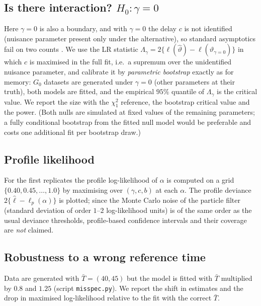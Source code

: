 \documentclass[11pt,a4paper]{article}
\newcommand{\Tb}{\bar T}
\begin{document}
\subsection{Is there interaction? $H_0:\gamma=0$}
Here $\gamma=0$ is also a boundary, and with $\gamma=0$ the delay $c$ is not identified (nuisance parameter present only under the alternative), so standard asymptotics fail on two counts \citep{Davies1977}. We use the LR statistic $\Lambda_\gamma=2\{\ell(\hat\vartheta)-\ell(\hat\vartheta_{\gamma=0})\}$ in which $c$ is maximised in the full fit, i.e.\ a supremum over the unidentified nuisance parameter, and calibrate it by \emph{parametric bootstrap} exactly as for memory: $G_0$ datasets are generated under $\gamma=0$ (other parameters at their truth), both models are fitted, and the empirical $95\%$ quantile of $\Lambda_\gamma$ is the critical value. We report the size with the $\chi^2_1$ reference, the bootstrap critical value and the power. (Both nulls are simulated at fixed values of the remaining parameters; a fully conditional bootstrap from the fitted null model would be preferable and costs one additional fit per bootstrap draw.)

\subsection{Profile likelihood}
For the first replicates the profile log-likelihood of $\alpha$ is computed on a grid $\{0.40,0.45,\dots,1.0\}$ by maximising over $(\gamma,c,b)$ at each $\alpha$. The profile deviance $2\{\hat\ell-\ell_p(\alpha)\}$ is plotted; since the Monte Carlo noise of the particle filter (standard deviation of order $1$--$2$ log-likelihood units) is of the same order as the usual deviance thresholds, profile-based confidence intervals and their coverage are \emph{not} claimed.

\subsection{Robustness to a wrong reference time}\label{sec:robust}
Data are generated with $\Tb=(40,45)$ but the model is fitted with $\Tb$ multiplied by $0.8$ and $1.25$ (script \texttt{misspec.py}). We report the shift in estimates and the drop in maximised log-likelihood relative to the fit with the correct $\Tb$.
\end{document}

